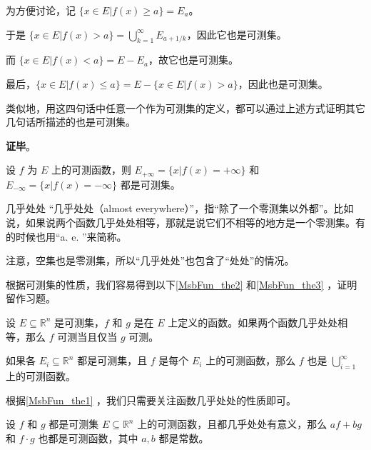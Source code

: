 为方便讨论，记 $\{x\in E|f(x)\geq a\}=E_a$。

于是 $\{x\in E|f(x)>a\}=\bigcup_{k=1}^\infty E_{a+1/k}$，因此它也是可测集。

而 $\{x\in E|f(x)<a\}=E-E_a$，故它也是可测集。

最后，$\{x\in E|f(x)\leq a\}=E-\{x\in E|f(x)>a\}$，因此也是可测集。

类似地，用这四句话中任意一个作为可测集的定义，都可以通过上述方式证明其它几句话所描述的也是可测集。

\textbf{证毕}。





\begin{corollary}{}
设 $f$ 为 $E$ 上的可测函数，则 $E_{+\infty}=\{x|f(x)=+\infty\}$ 和 $E_{-\infty}=\{x|f(x)=-\infty\}$ 都是可测集。
\end{corollary}



\begin{definition}{几乎处处}
“几乎处处（almost everywhere）”，指“除了一个零测集以外都”。比如说，如果说两个函数几乎处处相等，那就是说它们不相等的地方是一个零测集。有的时候也用“a. e. ”来简称。
\end{definition}

注意，空集也是零测集，所以“几乎处处”也包含了“处处”的情况。

根据可测集的性质，我们容易得到以下\autoref{MsbFun_the2} 和\autoref{MsbFun_the3} ，证明留作习题。

\begin{theorem}{}\label{MsbFun_the2}
设 $E\subseteq\mathbb{R}^n$ 是可测集，$f$ 和 $g$ 是在 $E$ 上定义的函数。如果两个函数几乎处处相等，那么 $f$ 可测当且仅当 $g$ 可测。
\end{theorem}



\begin{theorem}{}\label{MsbFun_the3}
如果各 $E_i\subseteq\mathbb{R}^n$ 都是可测集，且 $f$ 是每个 $E_i$ 上的可测函数，那么 $f$ 也是 $\bigcup_{i=1}^\infty$ 上的可测函数。
\end{theorem}

根据\autoref{MsbFun_the1} ，我们只需要关注函数几乎处处的性质即可。

\begin{theorem}{}
设 $f$ 和 $g$ 都是可测集 $E\subseteq\mathbb{R}^n$ 上的可测函数，且都几乎处处有意义，那么 $af+bg$ 和 $f\cdot g$ 也都是可测函数，其中 $a, b$ 都是常数。
\end{theorem}

